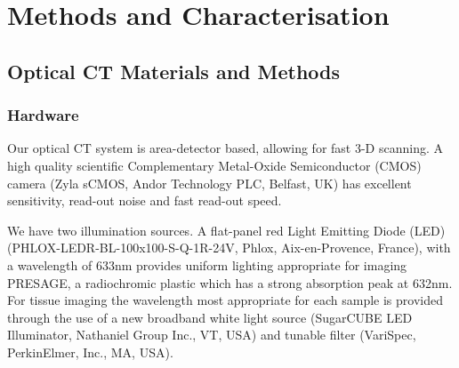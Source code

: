 \chapter{Methods and Characterisation}

\section{Optical CT Materials and Methods}
\subsection{Hardware}

Our  optical CT system is area-detector based, allowing for fast 3-D scanning. A high quality scientific Complementary Metal-Oxide Semiconductor (CMOS) camera (Zyla sCMOS, Andor Technology PLC, Belfast, UK) has excellent sensitivity, read-out noise and fast read-out speed. 

We have two illumination sources. A flat-panel red Light Emitting Diode (LED) 
(PHLOX-LEDR-BL-100x100-S-Q-1R-24V, Phlox, Aix-en-Provence, France), with a wavelength of 633nm provides uniform lighting appropriate for imaging PRESAGE\texttrademark , a radiochromic plastic which has a strong absorption peak at 632nm. 
For tissue imaging the wavelength most appropriate for each sample is provided through the use of a  new broadband white light source (SugarCUBE LED Illuminator, Nathaniel Group Inc., VT, USA) and tunable filter (VariSpec, PerkinElmer, Inc., MA, USA). 

